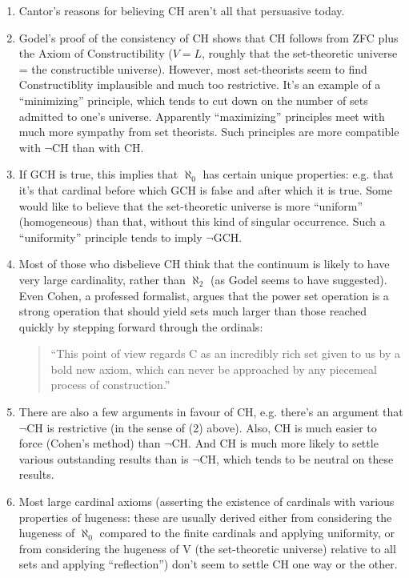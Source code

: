\begin{enumerate}
  \item Cantor's reasons for believing CH aren't all that persuasive today.

  \item Godel's proof of the consistency of CH shows that CH follows
  from ZFC plus the Axiom of Constructibility ($V=L$, roughly that the
  set-theoretic universe = the constructible universe).  However, most
  set-theorists seem to find Constructiblity implausible and much too
  restrictive.  It's an example of a ``minimizing'' principle, which
  tends to cut down on the number of sets admitted to one's universe.
  Apparently ``maximizing'' principles meet with much more sympathy from
  set theorists.  Such principles are more compatible with $\neg$CH than
  with CH.

  \item If GCH is true, this implies that $\aleph_0$ has certain unique
  properties: e.g. that it's that cardinal before which GCH is false and
  after which it is true.  Some would like to believe that the
  set-theoretic universe is more ``uniform'' (homogeneous) than that,
  without this kind of singular occurrence.  Such a ``uniformity''
  principle tends to imply $\neg$GCH.

  \item Most of those who disbelieve CH think that the continuum is
  likely to have very large cardinality, rather than $\aleph_2$ (as
  Godel seems to have suggested).  Even Cohen, a professed formalist,
  argues that the power set operation is a strong operation that should
  yield sets much larger than those reached quickly by stepping forward
  through the ordinals:

  \begin{quote}
    ``This point of view regards C as an incredibly rich set given to us
    by a bold new axiom, which can never be approached by any piecemeal
    process of construction.''
  \end{quote}

  \item There are also a few arguments in favour of CH, e.g. there's an
  argument that $\neg$CH is restrictive (in the sense of (2) above).
  Also, CH is much easier to force (Cohen's method) than $\neg$CH.  And
  CH is much more likely to settle various outstanding results than is
  $\neg$CH, which tends to be neutral on these results.

  \item Most large cardinal axioms (asserting the existence of cardinals
  with various properties of hugeness: these are usually derived either
  from considering the hugeness of $\aleph_0$ compared to the finite
  cardinals and applying uniformity, or from considering the hugeness of
  V (the set-theoretic universe) relative to all sets and applying
  ``reflection'') don't seem to settle CH one way or the other.


\end{enumerate}
